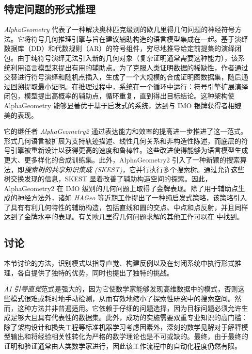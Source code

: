 \documentclass[11pt]{article}
\numberwithin{equation}{section}
\begin{document}
\subsection{特定问题的形式推理}

\textit{AlphaGeometry} \cite{trinh2024solving} 代表了一种解决奥林匹克级别的欧几里得几何问题的神经符号方法。它将符号几何推理引擎与旨在建议辅助构造的语言模型集成在一起。基于演绎数据库（DD）\cite{chou2000deductive}和代数规则（AR）的符号组件，穷尽地推导给定前提集的演绎闭包。由于纯符号演绎无法引入新的几何对象（复杂证明通常需要这种能力），该系统利用语言模型来提出有用的辅助点。为了克服人类证明数据的稀缺性，作者通过交替进行符号演绎和随机点插入，生成了一个大规模的合成证明图数据集，随后通过回溯提取最小证明。在推理过程中，系统在一个循环中运行：符号引擎扩展演绎闭包，模型提出高概率的辅助点，循环重复，直到得出目标结论。这种架构使 AlphaGeometry 能够显著优于基于启发式的系统，达到与 IMO 银牌获得者相媲美的表现。

它的继任者 \textit{AlphaGeometry2} \cite{chervonyi2025gold} 通过表达能力和效率的提高进一步推进了这一范式。形式几何语言被扩展为支持轨迹描述、线性几何关系和非构造性陈述，而底层的符号引擎被重新设计以获得更高的速度和鲁棒性。这些改进使得能够为语言模型生成更大、更多样化的合成训练集。此外，AlphaGeometry2 引入了一种新颖的搜索算法，即\textit{搜索树的共享知识集成 (SKEST)}，它并行执行多个搜索树。通过允许这些树交换发现的信息，SKEST 显着改善了辅助构造空间的探索。因此，AlphaGeometry2 在 IMO 级别的几何问题上取得了金牌表现。除了用于辅助点生成的神经方法外，诸如 \textit{HAGeo} \cite{duan2025gold} 等近期工作提出了一种纯启发式策略，该策略引入了具有有利几何特性的辅助构造，包括直线和圆的交点、中点和点反射，并且同样达到了金牌水平的表现。有关欧几里得几何问题求解的其他工作可以在 \cite{zhang2023formalgeo,he2024fgeo,zou2024fgeo,zhang2024fgeo,zhang2024proposing} 中找到。



\subsection{讨论}

本节讨论的方法，识别模式以指导直觉、构建反例以及在封闭系统中执行形式推理，各自提供了独特的优势，同时也提出了独特的挑战。

\textit{AI 引导直觉}范式是强大的，因为它使数学家能够发现高维数据中的模式，否则这些模式很难或耗时地手动检测，从而有效地缩小了探索性研究中的搜索空间。然而，这种方法并非普遍适用。它依赖于仔细的问题选择，因为目标问题必须允许生成足够大且具有代表性的数据集。此外，成功的实施需要双重专业知识的高门槛：除了架构设计和损失工程等标准机器学习考虑因素外，深刻的数学见解对于解释模型输出和将经验相关性转化为严格的数学理论也是不可或缺的。最终，由于最终的证明和验证通常由人类数学家进行，因此该工作流程中的自动化程度仍然有限。
\end{document}
